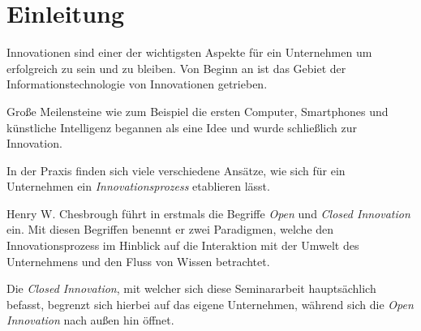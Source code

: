 \section{Einleitung}\label{sec:einleitung}

Innovationen sind einer der wichtigsten Aspekte für ein Unternehmen um erfolgreich zu sein und zu bleiben.
Von Beginn an ist das Gebiet der Informationstechnologie von Innovationen getrieben.

Große Meilensteine wie zum Beispiel die ersten Computer, Smartphones
und künstliche Intelligenz begannen als eine Idee und wurde schließlich zur Innovation.

In der Praxis finden sich viele verschiedene Ansätze,
wie sich für ein Unternehmen ein \textit{Innovationsprozess} etablieren lässt.

Henry W. Chesbrough führt in \cite{chesbrough2003} erstmals die Begriffe \textit{Open} und
\textit{Closed Innovation} ein.
Mit diesen Begriffen benennt er zwei Paradigmen, welche den Innovationsprozess im Hinblick auf die
Interaktion mit der Umwelt des Unternehmens und den Fluss von Wissen betrachtet.

Die \textit{Closed Innovation}, mit welcher sich diese Seminararbeit hauptsächlich befasst,
begrenzt sich hierbei auf das eigene Unternehmen, während sich die \textit{Open Innovation}
nach außen hin öffnet.
